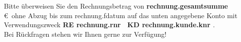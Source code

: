 \documentclass[a4paper,12pt,top=1.5cm,bottom=1.5cm]{article}
\begin{document}
    Bitte überweisen Sie den Rechnungsbetrag von {\bf {{ rechnung.gesamtsumme }}} \euro\ ohne Abzug bis zum
    {{ rechnung.fdatum }} auf das unten angegebene Konto mit Verwendungszweck
    {\bf RE {{ rechnung.rnr }} \ KD {{ rechnung.kunde.knr }}}.\\[2ex]
    Bei Rückfragen stehen wir Ihnen gerne zur Verfügung!


    
\end{document}
